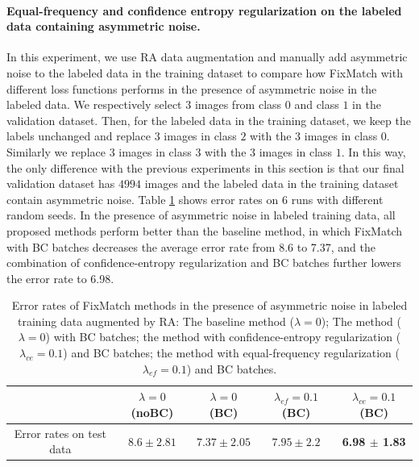 \paragraph{Equal-frequency and confidence entropy regularization on the labeled data containing asymmetric noise.}
In this experiment, we use RA data augmentation and manually add asymmetric noise to the labeled data in the training dataset to compare how FixMatch with different loss functions performs in the presence of asymmetric noise in the labeled data.
We respectively select $3$ images from class $0$ and class $1$ in the validation dataset. Then, for the labeled data in the training dataset, we keep the labels unchanged and replace $3$ images in class $2$ with the $3$ images in class $0$. Similarly we replace $3$ images in class $3$ with the $3$ images in class $1$. In this way, the only difference with the previous experiments in this section is that our final validation dataset has $4994$ images and the labeled data in the training dataset contain asymmetric noise. 
Table \ref{tab:ans} shows error rates on 6 runs with different random seeds.
In the presence of asymmetric noise in labeled training data, all proposed methods perform better than the baseline method, in which FixMatch with BC batches decreases the average error rate from 8.6 to 7.37, and the combination of confidence-entropy regularization and BC batches further lowers the error rate to 6.98.
\begin{table}[!h]
\centering
\caption{Error rates of FixMatch methods in the presence of asymmetric noise in labeled training data augmented by RA: 
The baseline method ($\lambda=0$);
The method ($\lambda=0$) with BC batches;
the method with confidence-entropy regularization ($\lambda_{ce}=0.1$) and BC batches;
the method with equal-frequency regularization ($\lambda_{ef}=0.1$) and BC batches.
}\label{tab:ans}
\begin{tabular}{cccc|c}
\hline
          & $\lambda=0$(noBC) & $\lambda=0$(BC)   & $\lambda_{ef}=0.1$(BC)   & $\lambda_{ce}=0.1$(BC)\\ \hline
Error rates on test data   & $8.6 \pm 2.81$ & $7.37 \pm 2.05$ & $7.95 \pm 2.2$  & \textbf{6.98 $\pm$ 1.83} \\ \hline
\end{tabular}
\end{table}


